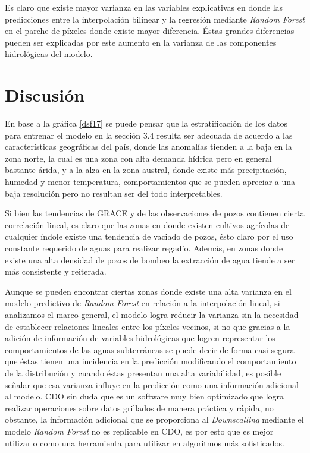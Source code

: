 Es claro que existe mayor varianza en las variables explicativas en donde las predicciones entre la interpolación bilinear y la regresión mediante \textit{Random Forest} en el parche de píxeles donde existe mayor diferencia. Éstas grandes diferencias
pueden ser explicadas por este aumento en la varianza de las componentes hidrológicas del modelo.
%
%

\section{Discusión}

En base a la gráfica \ref{dsf17} se puede pensar que la estratificación de los datos para entrenar el modelo en la sección 3.4 resulta ser adecuada de acuerdo a las características geográficas del país, donde las anomalías
tienden a la baja en la zona norte, la cual es una zona con alta demanda hídrica pero en general bastante árida, y a la alza en la zona austral, donde existe más precipitación, humedad y menor temperatura, comportamientos que se pueden apreciar a una baja resolución pero no resultan ser del todo interpretables.

Si bien las tendencias de GRACE y de las observaciones de pozos contienen cierta correlación lineal, es claro que las zonas en donde existen cultivos agrícolas de cualquier índole existe una tendencia de vaciado de pozos, ésto claro por el
uso constante requerido de aguas para realizar regadío. Además, en zonas donde existe una alta densidad de pozos de bombeo la extracción de agua tiende a ser más consistente y reiterada.

Aunque se pueden encontrar ciertas zonas donde existe una alta varianza en el modelo predictivo de \textit{Random Forest} en relación a la interpolación lineal, si analizamos el marco general, el modelo logra reducir la varianza sin la necesidad de establecer relaciones lineales entre los píxeles vecinos, si no que gracias a
la adición de información de variables hidrológicas que logren representar los comportamientos de las aguas subterráneas se puede decir de forma casi segura que éstas tienen una incidencia en la predicción modificando el comportamiento de la distribución y cuando éstas presentan una alta variabilidad, es 
posible señalar que esa varianza influye en la predicción como una información adicional al modelo. CDO sin duda que es un software muy 
bien optimizado que logra realizar operaciones sobre datos grillados de manera práctica y rápida, no obstante, la información adicional que se proporciona 
al \textit{Downscalling} mediante el modelo \textit{Random Forest} no es replicable en CDO, es por esto que es mejor utilizarlo como una herramienta para utilizar en algoritmos más sofisticados. 

